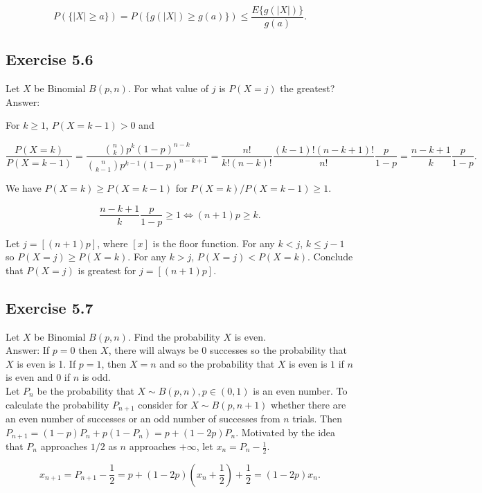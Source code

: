 \documentclass{article}
\begin{document}
$$
P(\{|X| \geq a \}) = P(\{g(|X|) \geq g(a)\}) \leq \frac{E\{g(|X|)\}}{g(a)}.
$$


\subsection*{Exercise 5.6}

Let $X$ be Binomial $B(p, n)$. For what value of $j$ is $P(X = j)$ the greatest?\\

Answer:

For $k \geq 1$, $P(X = k -1) > 0$ and

$$
\frac{P(X = k)}{P(X = k-1)}
= \frac{\binom{n}{k}p^k(1-p)^{n-k}}{\binom{n}{k-1}p^{k-1}(1-p)^{n-k+1}}
= \frac{n!}{k!(n-k)!}\frac{(k-1)!(n-k+1)!}{n!}\frac{p}{1-p}
= \frac{n-k+1}{k}\frac{p}{1-p}.
$$

We have $P(X = k) \geq P(X = k-1)$ for $P(X=k) / P(X = k-1) \geq 1$.

$$
\frac{n-k+1}{k}\frac{p}{1-p} \geq 1 \iff (n+1)p \geq k.
$$

Let $j = [(n+1)p]$, where $[x]$ is the floor function. For any $k < j$, $k \leq j-1$ so $P(X = j) \geq P(X = k)$. For any $k > j$, $P(X = j) < P(X = k)$. Conclude that $P(X = j)$ is greatest for $j = [(n+1)p]$. 

\subsection*{Exercise 5.7}

Let $X$ be Binomial $B(p, n)$. Find the probability $X$ is even. \\

Answer: If $p = 0$ then $X$, there will always be 0 successes so the probability that $X$ is even is 1. If $p = 1$, then $X = n$ and so the probability that $X$ is even is $1$ if $n$ is even and $0$ if $n$ is odd. \\

Let $P_n$ be the probability that $X \sim B(p,n), p \in (0,1)$ is an even number. To calculate the probability $P_{n+1}$ consider for $X \sim B(p,n+1)$ whether there are an even number of successes or an odd number of successes from $n$ trials. Then $P_{n+1} = (1-p)P_n + p(1-P_n) = p + (1-2p)P_n$. Motivated by the idea that $P_n$ approaches $1/2$ as $n$ approaches $+\infty$, let $x_n  = P_n - \frac{1}{2}$. 

$$
x_{n+1} = P_{n+1} - \frac{1}{2} = p + (1-2p)(x_n + \frac{1}{2}) + \frac{1}{2} = (1-2p)x_n.
$$
\end{document}
